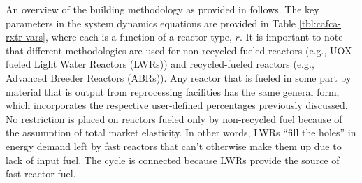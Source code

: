 An overview of the building methodology as provided
in \cite{busquim_e_silva_system_2008} follows. The key parameters in the system
dynamics equations are provided in Table \ref{tbl:cafca-rxtr-vars}, where each
is a function of a reactor type, $r$. It is important to note that different
methodologies are used for non-recycled-fueled reactors (e.g., UOX-fueled Light
Water Reactors (LWRs)) and recycled-fueled reactors (e.g., Advanced Breeder
Reactors (ABRs)). Any reactor that is fueled in some part by material that is
output from reprocessing facilities has the same general form, which
incorporates the respective user-defined percentages previously discussed. No
restriction is placed on reactors fueled only by non-recycled fuel because of
the assumption of total market elasticity. In other words, LWRs ``fill the
holes'' in energy demand left by fast reactors that can't otherwise make them up
due to lack of input fuel. The cycle is connected because LWRs provide the
source of fast reactor fuel.

